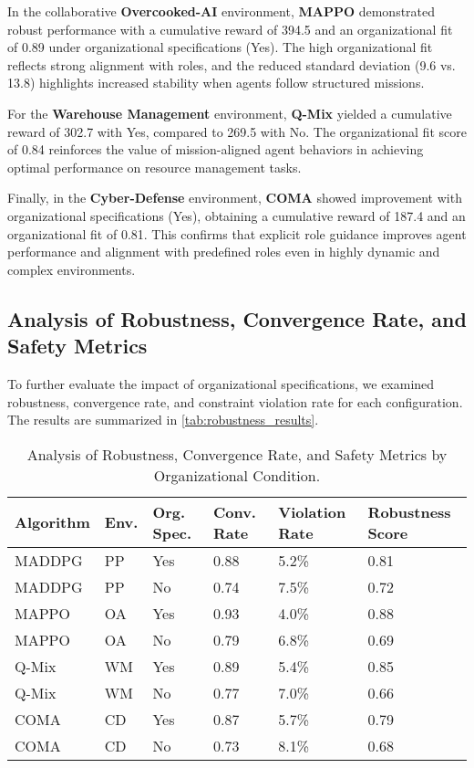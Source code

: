 \documentclass[sigconf,anonymous]{aamas}
\begin{document}
In the collaborative \textbf{Overcooked-AI} environment, \textbf{MAPPO} demonstrated robust performance with a cumulative reward of 394.5 and an organizational fit of 0.89 under organizational specifications (Yes). The high organizational fit reflects strong alignment with roles, and the reduced standard deviation (9.6 vs. 13.8) highlights increased stability when agents follow structured missions.

For the \textbf{Warehouse Management} environment, \textbf{Q-Mix} yielded a cumulative reward of 302.7 with Yes, compared to 269.5 with No. The organizational fit score of 0.84 reinforces the value of mission-aligned agent behaviors in achieving optimal performance on resource management tasks.

Finally, in the \textbf{Cyber-Defense} environment, \textbf{COMA} showed improvement with organizational specifications (Yes), obtaining a cumulative reward of 187.4 and an organizational fit of 0.81. This confirms that explicit role guidance improves agent performance and alignment with predefined roles even in highly dynamic and complex environments.

\subsection{Analysis of Robustness, Convergence Rate, and Safety Metrics}

To further evaluate the impact of organizational specifications, we examined robustness, convergence rate, and constraint violation rate for each configuration. The results are summarized in \autoref{tab:robustness_results}.

\begin{table}[h!]
    \centering
    \caption{Analysis of Robustness, Convergence Rate, and Safety Metrics by Organizational Condition.}
    \label{tab:robustness_results}
    \small
    \renewcommand{\arraystretch}{1.1}
    \begin{tabular}{p{1.2cm}p{0.5cm}p{1.4cm}p{0.5cm}p{1.2cm}p{1.2cm}}
        \hline
        \textbf{Algorithm} & \textbf{Env.} & \textbf{Org. Spec.} & \textbf{Conv. Rate} & \textbf{Violation Rate} & \textbf{Robustness Score} \\ \hline
        MADDPG & PP & Yes & 0.88 & 5.2\% & 0.81 \\
        MADDPG & PP & No & 0.74 & 7.5\% & 0.72 \\
        MAPPO & OA & Yes & 0.93 & 4.0\% & 0.88 \\
        MAPPO & OA & No & 0.79 & 6.8\% & 0.69 \\
        Q-Mix & WM & Yes & 0.89 & 5.4\% & 0.85 \\
        Q-Mix & WM & No & 0.77 & 7.0\% & 0.66 \\
        COMA & CD & Yes & 0.87 & 5.7\% & 0.79 \\
        COMA & CD & No & 0.73 & 8.1\% & 0.68 \\ \hline
    \end{tabular}
\end{table}
\end{document}
